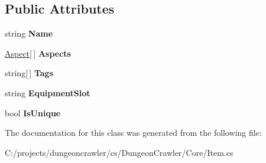 \subsection*{Public Attributes}
\begin{DoxyCompactItemize}
\item 
\hypertarget{class_dungeon_crawler_1_1_core_1_1_item_ab24f9d839ae3b24d3dbbceffa8617764}{}string {\bfseries Name}\label{class_dungeon_crawler_1_1_core_1_1_item_ab24f9d839ae3b24d3dbbceffa8617764}

\item 
\hypertarget{class_dungeon_crawler_1_1_core_1_1_item_af11c39625f65ca6261e749a9d4119c61}{}\hyperlink{class_dungeon_crawler_1_1_core_1_1_aspect}{Aspect}\mbox{[}$\,$\mbox{]} {\bfseries Aspects}\label{class_dungeon_crawler_1_1_core_1_1_item_af11c39625f65ca6261e749a9d4119c61}

\item 
\hypertarget{class_dungeon_crawler_1_1_core_1_1_item_a9b5424ecb05cba5b5e96db05de4bf71e}{}string\mbox{[}$\,$\mbox{]} {\bfseries Tags}\label{class_dungeon_crawler_1_1_core_1_1_item_a9b5424ecb05cba5b5e96db05de4bf71e}

\item 
\hypertarget{class_dungeon_crawler_1_1_core_1_1_item_a6d0c7b4ba5b26317ec7b5491f0f03501}{}string {\bfseries Equipment\+Slot}\label{class_dungeon_crawler_1_1_core_1_1_item_a6d0c7b4ba5b26317ec7b5491f0f03501}

\item 
\hypertarget{class_dungeon_crawler_1_1_core_1_1_item_a966c2d2589fb77bb66aef6ecaac11923}{}bool {\bfseries Is\+Unique}\label{class_dungeon_crawler_1_1_core_1_1_item_a966c2d2589fb77bb66aef6ecaac11923}

\end{DoxyCompactItemize}


The documentation for this class was generated from the following file\+:\begin{DoxyCompactItemize}
\item 
C\+:/projects/dungeoncrawler/cs/\+Dungeon\+Crawler/\+Core/Item.\+cs\end{DoxyCompactItemize}
